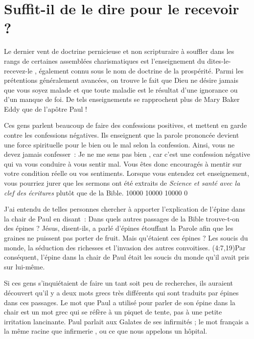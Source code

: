 \section*{Suffit-il de le dire pour le recevoir ?}

Le dernier vent de doctrine pernicieuse et non scripturaire à souffler
 dans les rangs de certaines assemblées charismatiques
 est l'en\-sei\-gne\-ment du \og dites-le-recevez-le \fg{},
 également connu sous le nom de doctrine de la prospérité.
 Parmi les prétentions généralement avancées, on trouve le fait
 que Dieu ne désire jamais que vous soyez malade et que toute maladie
 est le résultat d'une ignorance ou d'un manque de foi.
 De tels enseignements se rapprochent plus de Mary Baker Eddy
 que de l'apôtre Paul !

Ces gens parlent beaucoup de faire des confessions positives,
 et mettent en garde contre les confessions négatives.
 Ils enseignent que la parole prononcée devient une force spirituelle
 pour le bien ou le mal selon la confession.
 Ainsi, vous ne devez jamais confesser~: \og Je ne me sens pas bien \fg{},
 car c'est une confession négative qui va vous conduire à vous sentir mal.
 Vous êtes donc encouragés à mentir sur votre condition réelle
 ou vos sentiments. Lorsque vous entendez cet enseignement,
 vous pourriez jurer que les sermons ont été extraits
 de \emph{Science et santé avec la clef des écritures}
  plutôt que de la Bible.
 \begingroup{} 10000 10000 10000 0
 \par\endgroup

J'ai entendu de telles personnes chercher à apporter l'explication
 de l'épine dans la chair de Paul en disant~:
 \og Dans quels autres passages de la Bible trouve-t-on des épines ? \fg{}
 \og Jésus, disent-ils, a parlé d'épines étouffant la Parole afin
 que les graines ne puissent pas porter de fruit. \fg{}
 Mais qu'étaient ces épines ? Les soucis du monde,
 la séduction des richesses et l'invasion des autres convoitises.
 (4:7,19)Par conséquent, l'épine dans la chair de Paul
 était les soucis du monde qu'il avait pris sur lui-même.

Si ces gens s'inquiétaient de faire un tant soit peu de recherches,
 ils auraient découvert qu'il y a deux mots grecs très différents
 qui sont traduits par \og épines \fg{} dans ces passages.
 Le mot que Paul a utilisé pour parler de son épine dans la chair
 est un mot grec qui se réfère à un piquet de tente,
 pas à une petite irritation lancinante.
 Paul parlait aux Galates de ses infirmités ;
 le mot français a la même racine que \og infirmerie \fg{},
 ou ce que nous appelons un hôpital.

